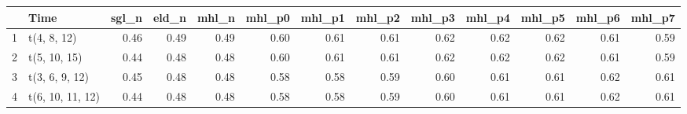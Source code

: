 \begin{table}[ht]
\centering
\begin{tabular}{rlrrrrrrrrrrr}
  \hline
 & Time & sgl\_n & eld\_n & mhl\_n & mhl\_p0 & mhl\_p1 & mhl\_p2 & mhl\_p3 & mhl\_p4 & mhl\_p5 & mhl\_p6 & mhl\_p7 \\ 
  \hline
1 & t(4, 8, 12) & 0.46 & 0.49 & 0.49 & 0.60 & 0.61 & 0.61 & 0.62 & 0.62 & 0.62 & 0.61 & 0.59 \\ 
  2 & t(5, 10, 15) & 0.44 & 0.48 & 0.48 & 0.60 & 0.61 & 0.61 & 0.62 & 0.62 & 0.62 & 0.61 & 0.59 \\ 
  3 & t(3, 6, 9, 12) & 0.45 & 0.48 & 0.48 & 0.58 & 0.58 & 0.59 & 0.60 & 0.61 & 0.61 & 0.62 & 0.61 \\ 
  4 & t(6, 10, 11, 12) & 0.44 & 0.48 & 0.48 & 0.58 & 0.58 & 0.59 & 0.60 & 0.61 & 0.61 & 0.62 & 0.61 \\ 
   \hline
\end{tabular}
\end{table}
